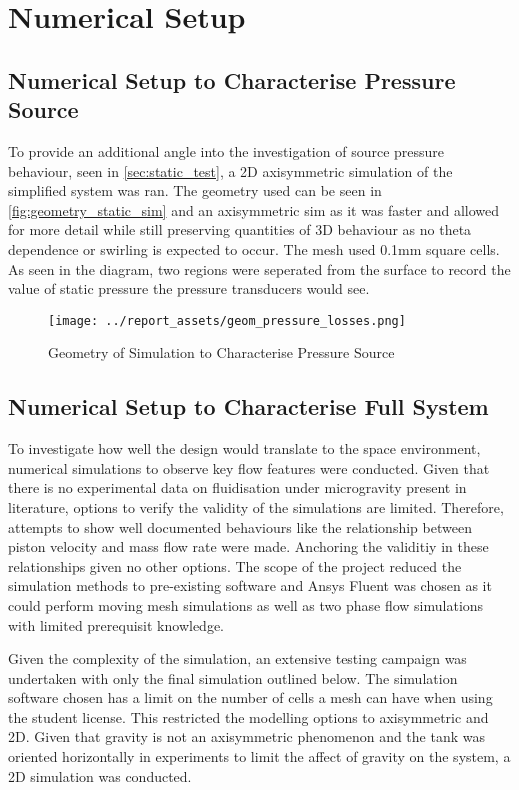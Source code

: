 \section{Numerical Setup}\label{sec:numerical-setup}
\subsection{Numerical Setup to Characterise Pressure Source}
To provide an additional angle into the investigation of source pressure behaviour, seen in \autoref{sec:static_test}, a 2D axisymmetric simulation of the simplified system was ran. The geometry used can be seen in \autoref{fig:geometry_static_sim} and an axisymmetric sim as it was faster and allowed for more detail while still preserving quantities of 3D behaviour as no theta dependence or swirling is expected to occur. The mesh used 0.1mm square cells. As seen in the diagram, two regions were seperated from the surface to record the value of static pressure the pressure transducers would see.
\begin{figure}[htbp]
    \centering

    \begin{minipage}{0.9\textwidth}
        \centering
        \texttt{[image: ../report\_assets/geom\_pressure\_losses.png]}
        \caption{Geometry of Simulation to Characterise Pressure Source}\label{fig:geometry_static_sim}
    \end{minipage}

\end{figure}
\subsection{Numerical Setup to Characterise Full System}
To investigate how well the design would translate to the space environment, numerical simulations to observe key flow features were conducted. Given that there is no experimental data on fluidisation under microgravity present in literature, options to verify the validity of the simulations are limited. Therefore, attempts to show well documented behaviours like the relationship between piston velocity and mass flow rate were made. Anchoring the validitiy in these relationships given no other options. The scope of the project reduced the simulation methods to pre-existing software and Ansys Fluent was chosen as it could perform moving mesh simulations as well as two phase flow simulations with limited prerequisit knowledge.

Given the complexity of the simulation, an extensive testing campaign was undertaken with only the final simulation outlined below. The simulation software chosen has a limit on the number of cells a mesh can have when using the student license. This restricted the modelling options to axisymmetric and 2D. Given that gravity is not an axisymmetric phenomenon and the tank was oriented horizontally in experiments to limit the affect of gravity on the system, a 2D simulation was conducted. 

